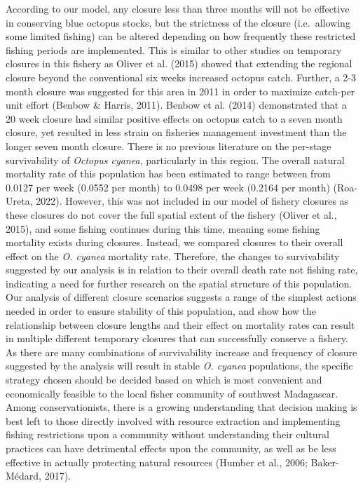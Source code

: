 \documentclass[
]{article}
\begin{document}
According to our model, any closure less than three months will not be effective in conserving blue octopus stocks, but the strictness of the closure (i.e.~allowing some limited fishing) can be altered depending on how frequently these restricted fishing periods are implemented. This is similar to other studies on temporary closures in this fishery as Oliver et al. (2015) showed that extending the regional closure beyond the conventional six weeks increased octopus catch. Further, a 2-3 month closure was suggested for this area in 2011 in order to maximize catch-per unit effort (Benbow \& Harris, 2011). Benbow et al. (2014) demonstrated that a 20 week closure had similar positive effects on octopus catch to a seven month closure, yet resulted in less strain on fisheries management investment than the longer seven month closure. There is no previous literature on the per-stage survivability of \emph{Octopus cyanea}, particularly in this region. The overall natural mortality rate of this population has been estimated to range between from 0.0127 per week (0.0552 per month) to 0.0498 per week (0.2164 per month) (Roa-Ureta, 2022). However, this was not included in our model of fishery closures as these closures do not cover the full spatial extent of the fishery (Oliver et al., 2015), and some fishing continues during this time, meaning some fishing mortality exists during closures. Instead, we compared closures to their overall effect on the \emph{O. cyanea} mortality rate. Therefore, the changes to survivability suggested by our analysis is in relation to their overall death rate not fishing rate, indicating a need for further research on the spatial structure of this population. Our analysis of different closure scenarios suggests a range of the simplest actions needed in order to ensure stability of this population, and show how the relationship between closure lengths and their effect on mortality rates can result in multiple different temporary closures that can successfully conserve a fishery. As there are many combinations of survivability increase and frequency of closure suggested by the analysis will result in stable \emph{O. cyanea} populations, the specific strategy chosen should be decided based on which is most convenient and economically feasible to the local fisher community of southwest Madagascar. Among conservationists, there is a growing understanding that decision making is best left to those directly involved with resource extraction and implementing fishing restrictions upon a community without understanding their cultural practices can have detrimental effects upon the community, as well as be less effective in actually protecting natural resources (Humber et al., 2006; Baker-Médard, 2017).
\end{document}
